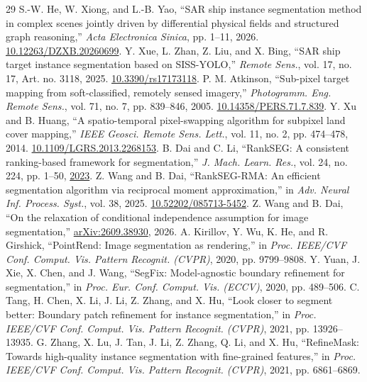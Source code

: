 \begin{thebibliography}{29}
 S.-W. He, W. Xiong, and L.-B. Yao, ``SAR ship instance segmentation method in complex scenes jointly driven by differential physical fields and structured graph reasoning,'' \emph{Acta Electronica Sinica}, pp. 1--11, 2026. \href{https://doi.org/10.12263/DZXB.20260699}{10.12263/DZXB.20260699}.
 Y. Xue, L. Zhan, Z. Liu, and X. Bing, ``SAR ship target instance segmentation based on SISS-YOLO,'' \emph{Remote Sens.}, vol. 17, no. 17, Art. no. 3118, 2025. \href{https://doi.org/10.3390/rs17173118}{10.3390/rs17173118}.
 P. M. Atkinson, ``Sub-pixel target mapping from soft-classified, remotely sensed imagery,'' \emph{Photogramm. Eng. Remote Sens.}, vol. 71, no. 7, pp. 839--846, 2005. \href{https://doi.org/10.14358/PERS.71.7.839}{10.14358/PERS.71.7.839}.
 Y. Xu and B. Huang, ``A spatio-temporal pixel-swapping algorithm for subpixel land cover mapping,'' \emph{IEEE Geosci. Remote Sens. Lett.}, vol. 11, no. 2, pp. 474--478, 2014. \href{https://doi.org/10.1109/LGRS.2013.2268153}{10.1109/LGRS.2013.2268153}.
 B. Dai and C. Li, ``RankSEG: A consistent ranking-based framework for segmentation,'' \emph{J. Mach. Learn. Res.}, vol. 24, no. 224, pp. 1--50, \href{https://www.jmlr.org/papers/v24/22-0712.html}{2023}.
 Z. Wang and B. Dai, ``RankSEG-RMA: An efficient segmentation algorithm via reciprocal moment approximation,'' in \emph{Adv. Neural Inf. Process. Syst.}, vol. 38, 2025. \href{https://doi.org/10.52202/085713-5452}{10.52202/085713-5452}.
 Z. Wang and B. Dai, ``On the relaxation of conditional independence assumption for image segmentation,'' \href{https://arxiv.org/abs/2609.38930}{arXiv:2609.38930}, 2026.
 A. Kirillov, Y. Wu, K. He, and R. Girshick, ``PointRend: Image segmentation as rendering,'' in \emph{Proc. IEEE/CVF Conf. Comput. Vis. Pattern Recognit. (CVPR)}, 2020, pp. 9799--9808.
 Y. Yuan, J. Xie, X. Chen, and J. Wang, ``SegFix: Model-agnostic boundary refinement for segmentation,'' in \emph{Proc. Eur. Conf. Comput. Vis. (ECCV)}, 2020, pp. 489--506.
 C. Tang, H. Chen, X. Li, J. Li, Z. Zhang, and X. Hu, ``Look closer to segment better: Boundary patch refinement for instance segmentation,'' in \emph{Proc. IEEE/CVF Conf. Comput. Vis. Pattern Recognit. (CVPR)}, 2021, pp. 13926--13935.
 G. Zhang, X. Lu, J. Tan, J. Li, Z. Zhang, Q. Li, and X. Hu, ``RefineMask: Towards high-quality instance segmentation with fine-grained features,'' in \emph{Proc. IEEE/CVF Conf. Comput. Vis. Pattern Recognit. (CVPR)}, 2021, pp. 6861--6869.

\end{thebibliography}
